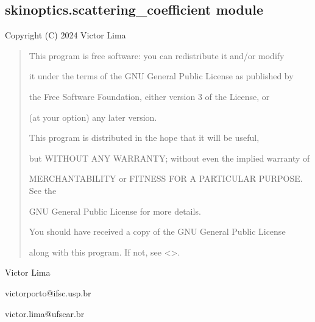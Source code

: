 \documentclass[letterpaper,10pt,english]{sphinxmanual}
\begin{document}
\subsection{skinoptics.scattering\_coefficient module}
\label{\detokenize{04_scattering_coefficient:module-skinoptics.scattering_coefficient}}\label{\detokenize{04_scattering_coefficient:skinoptics-scattering-coefficient-module}}\label{\detokenize{04_scattering_coefficient::doc}}
\sphinxAtStartPar
Copyright (C) 2024 Victor Lima
\begin{quote}

\begin{DUlineblock}{0em}
\item[] This program is free software: you can redistribute it and/or modify
\item[] it under the terms of the GNU General Public License as published by
\item[] the Free Software Foundation, either version 3 of the License, or
\item[] (at your option) any later version.
\end{DUlineblock}

\begin{DUlineblock}{0em}
\item[] This program is distributed in the hope that it will be useful,
\item[] but WITHOUT ANY WARRANTY; without even the implied warranty of
\item[] MERCHANTABILITY or FITNESS FOR A PARTICULAR PURPOSE.  See the
\item[] GNU General Public License for more details.
\end{DUlineblock}

\begin{DUlineblock}{0em}
\item[] You should have received a copy of the GNU General Public License
\item[] along with this program.  If not, see \textless{}\textgreater{}.
\end{DUlineblock}
\end{quote}

\begin{DUlineblock}{0em}
\item[] Victor Lima
\item[] victorporto@ifsc.usp.br
\item[] victor.lima@ufscar.br
\end{DUlineblock}
\end{document}
